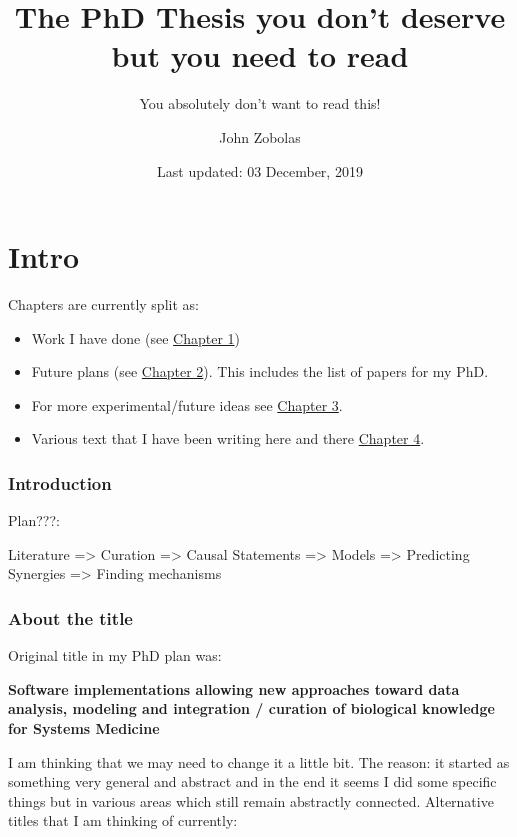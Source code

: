 \documentclass[
  12pt,
]{book}
\title{The PhD Thesis you don't deserve but you need to read}
\subtitle{You absolutely don't want to read this!}
\author{John Zobolas}
\date{Last updated: 03 December, 2019}
\providecommand{\tightlist}{%
  \setlength{\itemsep}{0pt}\setlength{\parskip}{0pt}}
\begin{document}
\maketitle

{
\hypersetup{linkcolor=}
\setcounter{tocdepth}{1}
\tableofcontents
}
\listoftables
\listoffigures
\hypertarget{intro}{%
\chapter*{Intro}\label{intro}}

Chapters are currently split as:

\begin{itemize}
\tightlist
\item
  Work I have done (see \protect\hyperlink{work}{Chapter 1})
\item
  Future plans (see \protect\hyperlink{plans}{Chapter 2}). This includes the list of papers for my PhD.
\item
  For more experimental/future ideas see \protect\hyperlink{ideas}{Chapter 3}.
\item
  Various text that I have been writing here and there \protect\hyperlink{text}{Chapter 4}.
\end{itemize}

\hypertarget{introduction}{%
\subsection*{Introduction}\label{introduction}}

Plan???:

Literature =\textgreater{} Curation =\textgreater{} Causal Statements =\textgreater{} Models =\textgreater{} Predicting Synergies =\textgreater{} Finding mechanisms

\hypertarget{about-the-title}{%
\subsection*{About the title}\label{about-the-title}}

Original title in my PhD plan was:

\textbf{Software implementations allowing new approaches toward data analysis, modeling and integration / curation of biological knowledge for Systems Medicine}

I am thinking that we may need to change it a little bit.
The reason: it started as something very general and abstract and in the end it seems I did some specific things but in various areas which still remain abstractly connected.
Alternative titles that I am thinking of currently:
\end{document}
